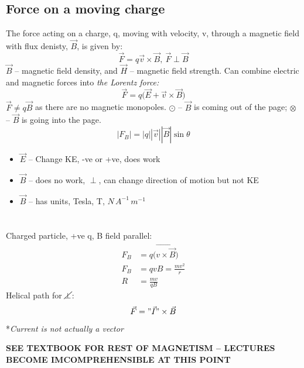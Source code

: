 \documentclass[a4paper, 11pt, normalem]{report}
\begin{document}
\section{Force on a moving charge}
The force acting on a charge, q, moving with velocity, v, through a magnetic field with flux denisty, $\vec{B}$, is given by:
\begin{equation}
    \vec{F} = q\vec{v} \times \vec{B}, ~ \vec{F} \perp \vec{B}
\end{equation}
$\vec{B}$ -- magnetic field density, and $\vec{H}$ -- magnetic field strength.
Can combine electric and magnetic forces into \emph{the Lorentz force:}
\begin{equation}
    \vec{F} = q \big( \vec{E} + \vec{v} \times \vec{B} \big)
\end{equation}
$\vec{F} \neq q\vec{B}$ as there are no magnetic monopoles.
$\odot$ -- $\vec{B}$ is coming out of the page; $\otimes$ -- $\vec{B}$ is going into the page.
\begin{equation}
    |F_{B}| = |q||\vec{v}||\vec{B}|\sin\theta
\end{equation}
\begin{itemize}
    \item $\vec{E}$ -- Change KE, -ve or +ve, does work
    \item $\vec{B}$ -- does no work, $\perp$, can change direction of motion but not KE
    \item $\vec{B}$ -- has units, Tesla, T, $N\,A^{-1}\,m^{-1}$
\end{itemize}

\chapter{}
Charged particle, +ve q, B field parallel:
\begin{align}
    F_{B} &= q\big(\vec{v \times \vec{B}} \big)\\
    F_{B} &= qvB = \frac{mv^{2}}{r} \\
    R &= \frac{mv}{qB}
\end{align}
Helical path for $\cancel{\perp}$:
\begin{equation}
    \vec{F} = "\vec{I}" \times \vec{B}
\end{equation}
*\textit{Current is not actually a vector}

\textbf{SEE TEXTBOOK FOR REST OF MAGNETISM -- LECTURES BECOME IMCOMPREHENSIBLE AT THIS POINT}
\end{document}
